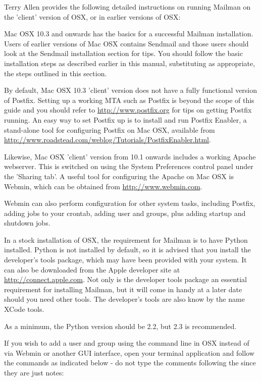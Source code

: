 \documentclass{howto}
\begin{document}
Terry Allen provides the following detailed instructions on running Mailman on
the 'client' version of OSX, or in earlier versions of OSX:

Mac OSX 10.3 and onwards has the basics for a successful Mailman installation.
Users of earlier versions of Mac OSX contains Sendmail and those users should
look at the Sendmail installation section for tips.  You should follow the
basic installation steps as described earlier in this manual, substituting as
appropriate, the steps outlined in this section.

By default, Mac OSX 10.3 'client' version does not have a fully functional
version of Postfix.  Setting up a working MTA such as Postfix is beyond the
scope of this guide and you should refer to \url{http://www.postfix.org} for
tips on getting Postfix running.  An easy way to set Postfix up is to install
and run Postfix Enabler, a stand-alone tool for configuring Postfix on Mac
OSX, available from 
\url{http://www.roadstead.com/weblog/Tutorials/PostfixEnabler.html}.

Likewise, Mac OSX 'client' version from 10.1 onwards includes a working Apache
webserver.  This is switched on using the System Preferences control panel
under the 'Sharing tab'.  A useful tool for configuring the Apache on Mac OSX
is Webmin, which can be obtained from
\url{http://www.webmin.com}.

Webmin can also perform configuration for other system tasks, including
Postfix, adding jobs to your crontab, adding user and groups, plus adding
startup and shutdown jobs.

In a stock installation of OSX, the requirement for Mailman is to have Python
installed.  Python is not installed by default, so it is advised that you
install the developer's tools package, which may have been provided with your
system.  It can also be downloaded from the Apple developer site at
\url{http://connect.apple.com}.  Not only is the developer tools package an
essential requirement for installing Mailman, but it will come in handy at a
later date should you need other tools.  The developer's tools are also know
by the name XCode tools.

As a minimum, the Python version should be 2.2, but 2.3 is recommended.

If you wish to add a user and group using the command line in OSX instead of
via Webmin or another GUI interface, open your terminal application and follow
the commands as indicated below - do not type the comments following the
\samp{\#} since they are just notes:
\end{document}
